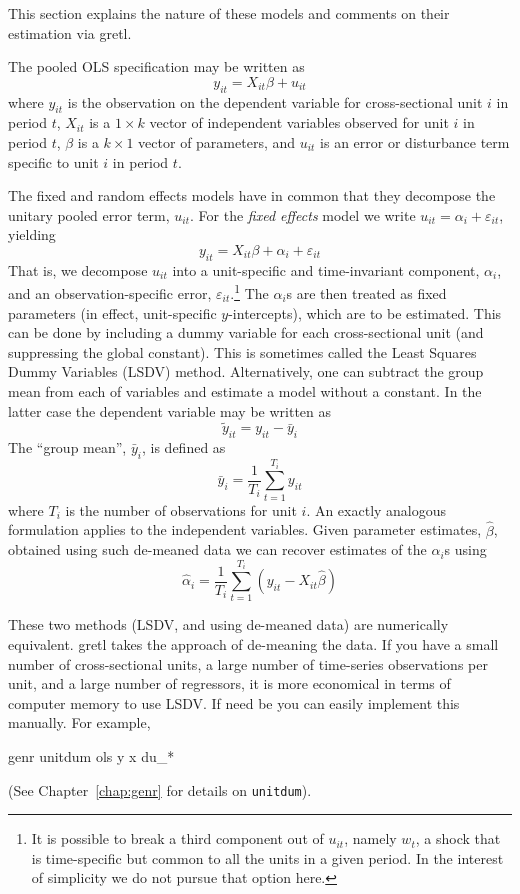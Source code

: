 This section explains the nature of these models and comments on their
estimation via gretl.

The pooled OLS specification may be written as 
\begin{equation}
\label{eq:pooled}
y_{it} = X_{it}\beta + u_{it}
\end{equation}
where $y_{it}$ is the observation on the dependent variable for
cross-sectional unit $i$ in period $t$, $X_{it}$ is a $1\times k$
vector of independent variables observed for unit $i$ in period $t$,
$\beta$ is a $k\times 1$ vector of parameters, and $u_{it}$ is an error
or disturbance term specific to unit $i$ in period $t$.

The fixed and random effects models have in common that they decompose
the unitary pooled error term, $u_{it}$.  For the \textsl{fixed effects}
model we write $u_{it} = \alpha_i + \varepsilon_{it}$, yielding
\begin{equation}
\label{eq:FE}
y_{it} = X_{it}\beta + \alpha_i + \varepsilon_{it}
\end{equation}
That is, we decompose $u_{it}$ into a unit-specific and time-invariant
component, $\alpha_i$, and an observation-specific error,
$\varepsilon_{it}$.\footnote{It is possible to break a third component
  out of $u_{it}$, namely $w_t$, a shock that is time-specific but
  common to all the units in a given period.  In the interest of
  simplicity we do not pursue that option here.}  The $\alpha_i$s are
then treated as fixed parameters (in effect, unit-specific
$y$-intercepts), which are to be estimated.  This can be done by
including a dummy variable for each cross-sectional unit (and
suppressing the global constant).  This is sometimes called the Least
Squares Dummy Variables (LSDV) method.  Alternatively, one can subtract
the group mean from each of variables and estimate a model without a
constant.  In the latter case the dependent variable may be written as
\[
\tilde{y}_{it} = y_{it} - \bar{y}_i
\]
The ``group mean'', $\bar{y}_i$, is defined as
\[
\bar{y}_i = \frac{1}{T_i} \sum_{t=1}^{T_i} y_{it}
\]
where $T_i$ is the number of observations for unit $i$.  An exactly
analogous formulation applies to the independent variables.  Given
parameter estimates, $\hat{\beta}$, obtained using such de-meaned data
we can recover estimates of the $\alpha_i$s using
\[
\hat{\alpha}_i = \frac{1}{T_i} \sum_{t=1}^{T_i} 
   \left(y_{it} - X_{it}\hat{\beta}\right)
\]

These two methods (LSDV, and using de-meaned data) are numerically
equivalent. gretl takes the approach of de-meaning the data.  If
you have a small number of cross-sectional units, a large number of
time-series observations per unit, and a large number of regressors,
it is more economical in terms of computer memory to use LSDV.  If 
need be you can easily implement this manually.  For example,
%
\begin{code}
genr unitdum
ols y x du_*
\end{code}
%
(See Chapter~\ref{chap:genr} for details on \texttt{unitdum}).

